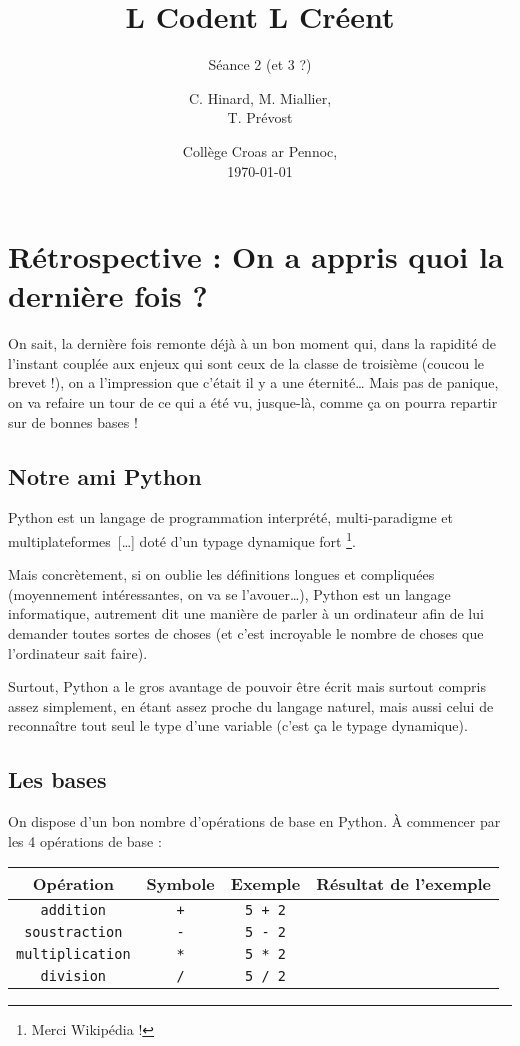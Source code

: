 \documentclass[12pt,a4paper, oneside]{article}
\title[LCLC -- Séance 2 (et 3 ?)]{\og L Codent L Créent \fg{}}
\subtitle{Séance 2 (et 3 ?)}
\author{C. Hinard, M. Miallier, \\T. Prévost}
\date{Collège Croas ar Pennoc,\\ \today}
\theoremstyle{definition}
\begin{document}
\maketitle

  \section{Rétrospective : On a appris quoi la dernière fois ?}\label{sec:rétrospective-:-on-a-appris-quoi-la-dernière-fois-?}
   On sait, la dernière fois remonte déjà à un bon moment qui, dans la rapidité de l'instant couplée aux enjeux qui sont ceux de la classe de troisième (coucou le brevet !), on a l'impression que c'était il y a une éternité\dots
  Mais pas de panique, on va refaire un tour de ce qui a été vu, jusque-là, comme ça on pourra repartir sur de bonnes bases !

   \subsection{Notre ami Python}\label{subsec:notre-ami-python}
      Python est \og un langage de programmation interprété, multi-paradigme et multiplateformes~[\dots] doté d'un typage dynamique fort \fg{}\footnote{Merci Wikipédia !}.

      Mais concrètement, si on oublie les définitions longues et compliquées (moyennement intéressantes, on va se l'avouer\dots), Python est un langage informatique, autrement dit une manière de parler à un ordinateur afin de lui demander toutes sortes de choses (et c'est incroyable le nombre de choses que l'ordinateur sait faire).

       Surtout, Python a le gros avantage de pouvoir être écrit mais surtout compris assez simplement, en étant assez proche du langage naturel, mais aussi celui de reconnaître tout seul le type d'une variable (c'est ça le typage dynamique).

   \subsection{Les bases}\label{subsec:les-bases}
      On dispose d'un bon nombre d'opérations de base en Python.
      À commencer par les 4 opérations de base :
      \begin{center}
         \begin{tabular}{|c|c|c|c|}
           \hline
           \textbf{Opération} & \textbf{Symbole} & \textbf{Exemple} & \textbf{Résultat de l'exemple} \\
           \hline
            \texttt{addition} & \texttt{+} & \texttt{5 + 2} &  \\
           \hline
            \texttt{soustraction} & \texttt{-} & \texttt{5 - 2} & \\
           \hline
            \texttt{multiplication} & \texttt{*} & \texttt{5 * 2} & \\
           \hline
            \texttt{division} & \texttt{/} & \texttt{5 / 2} & \\
           \hline
         \end{tabular}
      \end{center}
\end{document}

